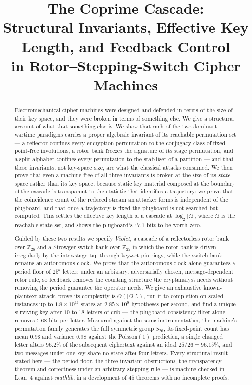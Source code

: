 \documentclass[11pt]{article}
\title{\bf The Coprime Cascade:\\[2pt]
\large Structural Invariants, Effective Key Length, and Feedback Control\\
in Rotor--Stepping-Switch Cipher Machines}
\author{}
\date{}
\theoremstyle{definition}
\newcommand{\ZZ}{\mathbb{Z}}
\newcommand{\Om}{\Omega}
\begin{document}
\maketitle
\vspace{-2.2\baselineskip}

\begin{abstract}
\noindent
Electromechanical cipher machines were designed and defended in terms of the
size of their key space, and they were broken in terms of something else. We
give a structural account of what that something else is. We show that each of
the two dominant wartime paradigms carries a proper algebraic invariant of its
reachable permutation set --- a reflector confines every encryption permutation
to the conjugacy class of fixed-point-free involutions, a rotor bank freezes the
signature of its stage permutation, and a split alphabet confines every
permutation to the stabiliser of a partition --- and that these invariants,
not key-space size, are what the classical attacks consumed. We then prove that
even a machine free of all three invariants is broken at the size of its
\emph{state} space rather than its key space, because static key material
composed at the boundary of the cascade is transparent to the statistic that
identifies a trajectory: we prove that the coincidence count of the reduced
stream an attacker forms is independent of the plugboard, and that once a
trajectory is fixed the plugboard is not searched but computed. This settles the
effective key length of a cascade at $\log_2|\Om|$, where $\Om$ is the reachable
state set, and shows the plugboard's $47.1$ bits to be worth zero.

Guided by these two results we specify \emph{Violet}, a cascade of a
reflectorless rotor bank over $\ZZ_{26}$ and a Strowger switch bank over
$\ZZ_{25}$ in which the rotor bank is driven irregularly by the inter-stage tap
through key-set pin rings, while the switch bank remains an autonomous clock. We
prove that the autonomous clock alone guarantees a period floor of $25^{k}$
letters under an arbitrary, adversarially chosen, message-dependent rotor rule,
so feedback removes the counting structure the cryptanalyst needs without
removing the period guarantee the operator needs. We give an exhaustive
known-plaintext attack, prove its complexity is $\Theta(|\Om| L)$, run it to
completion on scaled instances up to $1.8\times10^{11}$ states at
$2.85\times10^{8}$ hypotheses per second, and find a unique surviving key after
$10$ to $18$ letters of crib --- the plugboard-consistency filter alone removes
$2.68$ bits per letter. Measured against the same instrumentation, the machine's
permutation family generates the full symmetric group $S_{26}$, its fixed-point
count has mean $0.98$ and variance $0.98$ against the Poisson$(1)$ prediction, a
single changed letter alters $96.2\%$ of the subsequent ciphertext against an
ideal $25/26 = 96.15\%$, and two messages under one key share no state after
four letters. Every structural result stated here --- the period floor, the three
invariant obstructions, the transparency theorem and correctness under an
arbitrary stepping rule --- is machine-checked in Lean~4 against \emph{mathlib},
in a development of $45$ theorems with no incomplete proofs.
\end{abstract}
\end{document}
